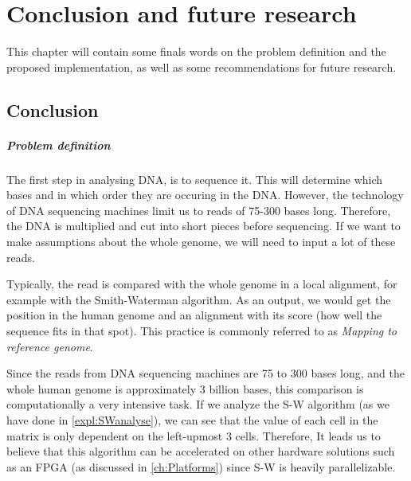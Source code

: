 
\chapter{Conclusion and future research}
\label{ch:Conclusions}

This chapter will contain some finals words on the problem definition and the proposed implementation, as well as some recommendations for future research.

\section{Conclusion}

\paragraph{Problem definition} 

The first step in analysing DNA, is to sequence it. This will determine which bases and in which order they are occuring in the DNA. However, the technology of DNA sequencing machines limit us to reads of 75-300 bases long. Therefore, the DNA is multiplied and cut into short pieces before sequencing. If we want to make assumptions about the whole genome, we will need to input a lot of these reads. 

Typically, the read is compared with the whole genome in a local alignment, for example with the Smith-Waterman algorithm. As an output, we would get the position in the human genome and an alignment with its score (how well the sequence fits in that spot). This practice is commonly referred to as \emph{Mapping to reference genome}.

Since the reads from DNA sequencing machines are 75 to 300 bases long, and the whole human genome is approximately 3 billion bases, this comparison is computationally a very intensive task. If we analyze the S-W algorithm (as we have done in \ref{expl:SWanalyse}), we can see that the value of each cell in the matrix is only dependent on the left-upmost 3 cells. Therefore, It leads us to believe that this algorithm can be accelerated on other hardware solutions such as an FPGA (as discussed in \ref{ch:Platforms}) since S-W is heavily parallelizable.

